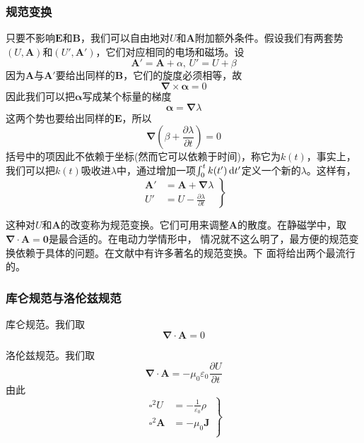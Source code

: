 \subsubsection{规范变换}
只要不影响$\boldsymbol{E}$和$\boldsymbol{B}$，我们可以自由地对$U$和$\boldsymbol{A}$附加额外条件。假设我们有两套势$(U,\boldsymbol{A})$和$(U',\boldsymbol{A}')$，它们对应相同的电场和磁场。设
$$\boldsymbol{A}'=\boldsymbol{A}+\alpha,\, U'=U+\beta$$
因为$\boldsymbol{A}$与$\boldsymbol{A}'$要给出同样的$\boldsymbol{B}$，它们的旋度必须相等，故
$$\boldsymbol{\nabla}\times\boldsymbol{\alpha}=0$$
因此我们可以把$\boldsymbol{\alpha}$写成某个标量的梯度
$$\boldsymbol{\alpha}=\boldsymbol{\nabla}\lambda$$
这两个势也要给出同样的$\boldsymbol{E}$，所以
$$\boldsymbol{\nabla}\left(\beta+\frac{\partial\lambda}{\partial t}\right)=0$$
括号中的项因此不依赖于坐标(然而它可以依赖于时间)，称它为$k(t)$，事实上，我们可以把$k(t)$吸收进$\lambda$中，通过增加一项$\int_{0}^{t}k(t')\dif t'$定义一个新的$\lambda$。这样有，
\begin{equation}
    \left.\begin{aligned}
    \boldsymbol{A}'&=\boldsymbol{A}+\boldsymbol{\nabla}\lambda\\
    U'&=U-\frac{\partial\lambda}{\partial t}
    \end{aligned}\right\}
\end{equation}

这种对$U$和$\boldsymbol{A}$的改变称为规范变换。它们可用来调整$\boldsymbol{A}$的散度。在静磁学中，取$\boldsymbol{\nabla}·\boldsymbol{A}=\boldsymbol{0}$是最合适的。在电动力学情形中，
情况就不这么明了，最方便的规范变换依赖于具体的问题。在文献中有许多著名的规范变换。下
面将给出两个最流行的。
\subsubsection{库仑规范与洛伦兹规范}
库仑规范。我们取
\begin{equation}
    \boldsymbol{\nabla}\cdot\boldsymbol{A}=0
\end{equation}

洛伦兹规范。我们取
\begin{equation}
    \boldsymbol{\nabla}\cdot\boldsymbol{A}=-\mu_0\varepsilon_0\frac{\partial U}{\partial t}
\end{equation}
由此
\begin{equation}
    \left.\begin{aligned}
    \square^2U&=-\frac{1}{\varepsilon_0}\rho\\
    \square^2\boldsymbol{A}&=-\mu_0\boldsymbol{J}\\
    \end{aligned}\right\}
\end{equation}

